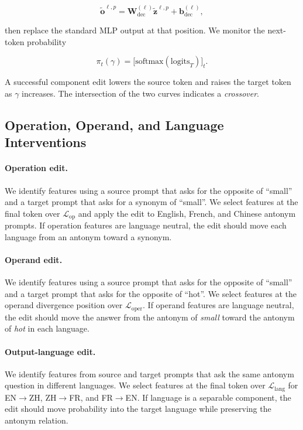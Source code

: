 \begin{equation}
  \tilde{\mathbf{o}}^{\ell,p}
    = \mathbf{W}_{\mathrm{dec}}^{(\ell)}\tilde{\mathbf{z}}^{\ell,p}
      + \mathbf{b}_{\mathrm{dec}}^{(\ell)},
  \label{eq:decode-multi}
\end{equation}

then replace the standard MLP output at that position.  We monitor the next-token
probability

\begin{equation}
  \pi_t(\gamma)
    = \bigl[\mathrm{softmax}(\mathrm{logits}_T)\bigr]_t.
  \label{eq:pi-gamma}
\end{equation}

A successful component edit lowers the source token and raises the target token
as $\gamma$ increases. The intersection of the two curves indicates a \textit{crossover}.

\subsection{Operation, Operand, and Language Interventions}
\label{subsec:multilingual-experiments}

\paragraph{Operation edit.}
We identify features using a source prompt that asks for the opposite of
``small'' and a target prompt that asks for a synonym of ``small''.  We select
features at the final token over $\mathcal{L}_{\mathrm{op}}$ and apply the edit
to English, French, and Chinese antonym prompts.  If operation features are
language neutral, the edit should move each language from an antonym toward a
synonym.

\paragraph{Operand edit.}
We identify features using a source prompt that asks for the opposite of
``small'' and a target prompt that asks for the opposite of ``hot''.  We select
features at the operand divergence position over $\mathcal{L}_{\mathrm{oper}}$.
If operand features are language neutral, the edit should move the answer from
the antonym of \textit{small} toward the antonym of \textit{hot} in each
language.

\paragraph{Output-language edit.}
We identify features from source and target prompts that ask the same antonym
question in different languages.  We select features at the final token over
$\mathcal{L}_{\mathrm{lang}}$ for EN$\to$ZH, ZH$\to$FR, and FR$\to$EN.  If
language is a separable component, the edit should move probability into the target
language while preserving the antonym relation.

